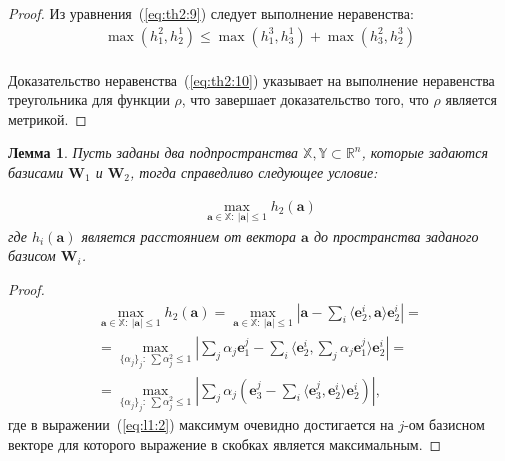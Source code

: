 \documentclass[12pt, twoside]{article}
\newtheorem{lemma}[theorem]{Лемма}
\numberwithin{equation}{section}
\begin{document}
\begin{proof}
Из уравнения~(\ref{eq:th2:9}) следует выполнение неравенства:
\begin{equation}
\label{eq:th2:10}
\begin{aligned}
\max\left(h_{1}^{2}, h_{2}^{1}\right) \leq  \max\left(h_{1}^{3}, h_{3}^{1}\right) + \max\left(h_{3}^{2}, h_{2}^{3}\right)\\
\end{aligned}
\end{equation}

Доказательство неравенства~(\ref{eq:th2:10}) указывает на выполнение неравенства треугольника для функции $\rho$, что завершает доказательство того, что $\rho$ является метрикой.

\end{proof}


\begin{lemma} \label{lem:1} 
Пусть заданы два подпространства $\mathbb{X}, \mathbb{Y} \subset \mathbb{R}^{n}$, которые задаются базисами $\textbf{W}_1$ и  $\textbf{W}_2$, тогда справедливо следующее условие:

\begin{equation}
\label{eq:l1:1}
\begin{aligned}
\max_{\textbf{a} \in \mathbb{X}:~\left|\textbf{a}\right|\leq 1}h_2\left(\textbf{a}\right)
\end{aligned}
\end{equation}
где $h_i\left(\textbf{a}\right)$ является расстоянием от вектора $\textbf{a}$ до пространства заданого базисом $\textbf{W}_i$.
\end{lemma}

\begin{proof}
\begin{equation}
\label{eq:l1:2}
\begin{aligned}
\max_{\textbf{a} \in \mathbb{X}:~\left|\textbf{a}\right|\leq 1}h_2\left(\textbf{a}\right) = \max_{\textbf{a} \in \mathbb{X}:~\left|\textbf{a}\right|\leq 1}\left|\textbf{a}-\sum_{i}\langle \textbf{e}^i_2, \textbf{a} \rangle\textbf{e}^i_2 \right| = \\ 
=\max_{\{\alpha_j\}_{j}:~\sum\alpha_j^2\leq 1}\left|\sum_{j}\alpha_j\textbf{e}^{j}_1-\sum_{i}\langle \textbf{e}^i_2, \sum_{j}\alpha_j\textbf{e}^{j}_1 \rangle\textbf{e}^i_2 \right| =\\
= \max_{\{\alpha_j\}_{j}:~\sum\alpha_j^2\leq 1}\left|\sum_{j}\alpha_j\left(\textbf{e}_3^j - \sum_{i}\langle\textbf{e}_3^j,\textbf{e}_2^i\rangle\textbf{e}_2^i\right)\right|,
\end{aligned}
\end{equation}
где в выражении~(\ref{eq:l1:2}) максимум очевидно достигается на $j$-ом базисном векторе для которого выражение в скобках является максимальным.
\end{proof}
\end{document}
